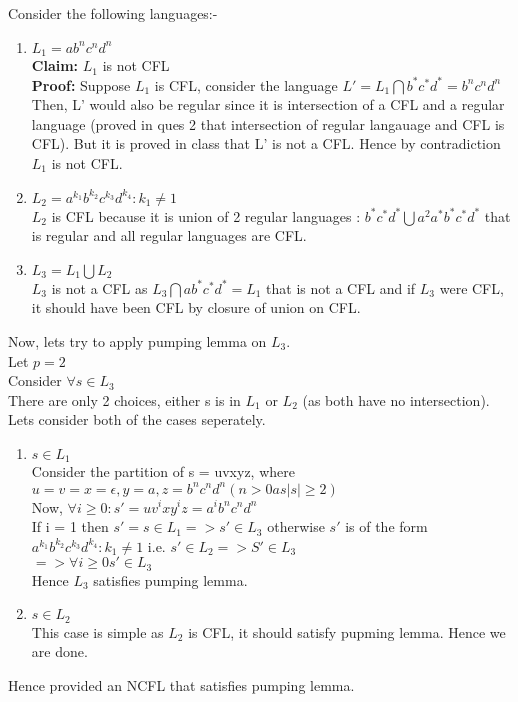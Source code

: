 \documentclass{article}
\begin{document}
Consider the following languages:-\\
\begin{enumerate}
    \item $L_1 = ab^nc^nd^n$\\
        \textbf{Claim: }$L_1$ is not CFL\\
        \textbf{Proof: }Suppose $L_1$ is CFL, consider the language $L' = L_1 \bigcap b^*c^*d^* = b^nc^nd^n$\\
        Then, L' would also be regular since it is intersection of a CFL and a regular language (proved in ques 2 that intersection
        of regular langauage and CFL is CFL). But it is proved in class that L' is not a CFL. 
        Hence by contradiction $L_1$ is not CFL. 
    \item $L_2 = a^{k_1}b^{k_2}c^{k_3}d^{k_4} : k_1 \neq 1$\\
        $L_2$ is CFL because it is union of 2 regular languages : $b^*c^*d^* \bigcup a^2a^*b^*c^*d^*$ that is regular and all regular languages are CFL.
    \item $L_3 = L_1 \bigcup L_2$ \\
        $L_3$ is not a CFL as $L_3 \bigcap ab^*c^*d^* = L_1$ that is not a CFL and if $L_3$ were CFL, it should have been CFL by closure of union on CFL.
\end{enumerate}


Now, lets try to apply pumping lemma on $L_3$.\\
Let $p = 2$\\
Consider $\forall s \in L_3$\\
There are only 2 choices, either s is in $L_1$ or $L_2$ (as both have no intersection). Lets consider both of the cases seperately.\\
\begin{enumerate}
    \item $s \in L_1$\\
    Consider the partition of s = uvxyz, where $u = v = x = \epsilon, y = a, z = b^nc^nd^n (n > 0 as |s| \geq 2)$ \\
    Now, $\forall i \geq 0 : s' = uv^ixy^iz = a^ib^nc^nd^n$\\
    If i = 1 then $s'=s \in L_1 => s' \in L_3$ otherwise $s' $ is of the form  $a^{k_1}b^{k_2}c^{k_3}d^{k_4} : k_1 \neq 1$ i.e. $s' \in L_2 => S' \in L_3$\\
    $=> \forall i \geq 0 s' \in L_3$\\
    Hence $L_3$  satisfies pumping lemma.
    \item $s \in L_2$ \\
    This case is simple as $L_2$ is CFL, it should satisfy pupming lemma. Hence we are done.
\end{enumerate}
Hence provided an NCFL that satisfies pumping lemma.
\pagebreak
\end{document}
